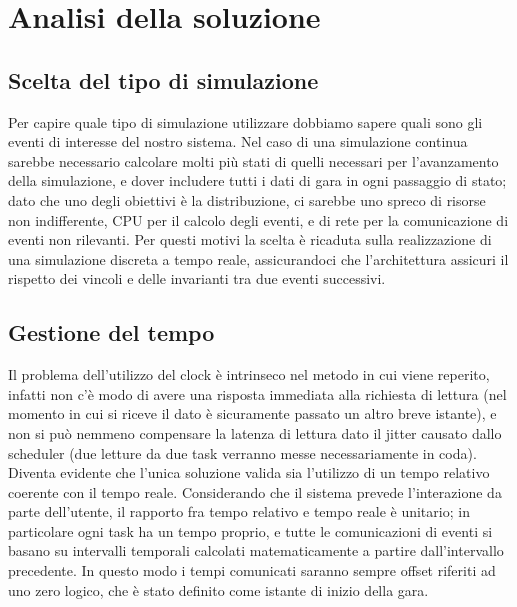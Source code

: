 \chapter{Analisi della soluzione} %

\label{Chapter3} %


\section{Scelta del tipo di simulazione}
Per capire quale tipo di simulazione utilizzare dobbiamo sapere quali sono gli eventi di interesse del nostro sistema.
Nel caso di una simulazione continua sarebbe necessario calcolare molti più stati di quelli necessari per l’avanzamento della simulazione, e dover includere tutti i dati di gara in ogni passaggio di stato; dato che uno degli obiettivi è la distribuzione, ci sarebbe uno spreco di risorse non indifferente, CPU per il calcolo degli eventi, e di rete per la comunicazione di eventi non rilevanti.
Per questi motivi la scelta è ricaduta sulla realizzazione di una simulazione discreta a tempo reale, assicurandoci che l’architettura assicuri il rispetto dei vincoli e delle invarianti tra due eventi successivi.

\section{Gestione del tempo}
Il problema dell’utilizzo del clock è intrinseco nel metodo in cui viene reperito, infatti non c’è modo di avere una risposta immediata alla richiesta di lettura (nel momento in cui si riceve il dato è sicuramente passato un altro breve istante), e non si può nemmeno compensare la latenza di lettura dato il jitter causato dallo scheduler (due letture da due task verranno messe necessariamente in coda).
Diventa evidente che l’unica soluzione valida sia l’utilizzo di un tempo relativo coerente con il tempo reale. Considerando che il sistema prevede l'interazione da parte dell'utente, il rapporto fra tempo relativo e tempo reale è unitario; in particolare ogni task ha un tempo proprio, e tutte le comunicazioni di eventi si basano su intervalli temporali calcolati matematicamente a partire dall’intervallo precedente. In questo modo i tempi comunicati saranno sempre offset riferiti ad uno zero logico, che è stato definito come istante di inizio della gara.

